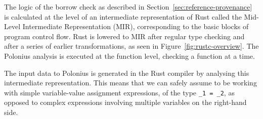 \documentclass[11pt,a4paper,twoside,openany,draft]{report}
\newcommand{\InRust}[1]{\texttt{#1}}
\begin{document}
The logic of the borrow check as described in
Section~\ref{sec:reference-provenance} is calculated at the level of an
intermediate representation of Rust called the Mid-Level Intermediate
Representation (MIR), corresponding to the basic blocks of program control flow.
Rust is lowered to MIR after regular type checking and after a series of earlier
transformations, as seen in Figure~\ref{fig:rustc-overview}. The Polonius
analysis is executed at the function level, checking a function at a time. 

The input data to Polonius is generated in the Rust compiler by analysing this
intermediate representation. This means that we can safely assume to be working
with simple variable-value assignment expressions, of the type \InRust{_1 = _2},
as opposed to complex expressions involving multiple variables on the right-hand
side.
\end{document}
